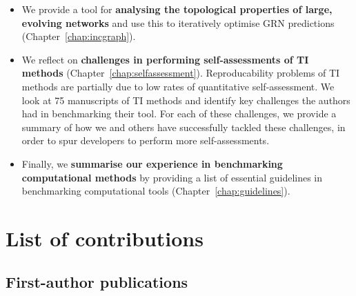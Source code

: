 \begin{itemize}
	\item We provide a tool for \textbf{analysing the topological properties of large, evolving networks} and use this to iteratively optimise GRN predictions (Chapter~\ref{chap:incgraph}).
	\item We reflect on \textbf{challenges in performing self-assessments of TI methods} (Chapter~\ref{chap:selfassessment}).
	Reproducability problems of TI methods are partially due to low rates of quantitative self-assessment. We look at 75 manuscripts of TI methods and identify key challenges the authors had in benchmarking their tool. For each of these challenges, we provide a summary of how we and others have successfully tackled these challenges, in order to spur developers to perform more self-assessments.
	\item Finally, we \textbf{summarise our experience in benchmarking computational methods} by providing a list of essential guidelines in benchmarking computational tools (Chapter~\ref{chap:guidelines}).
\end{itemize}


\section{List of contributions}
\subsection{First-author publications}

